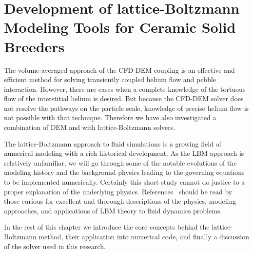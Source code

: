 \chapter{Development of lattice-Boltzmann Modeling Tools for Ceramic Solid Breeders}\label{sec:modeling-lbm}
The volume-averaged approach of the CFD-DEM coupling is an effective and efficient method for solving transiently coupled helium flow and pebble interaction. However, there are cases when a complete knowledge of the tortuous flow of the interstitial helium is desired. But because the CFD-DEM solver does not resolve the pathways on the particle scale, knowledge of precise helium flow is not possible with that technique. Therefore we have also investigated a combination of DEM and with lattice-Boltzmann solvers. 

The lattice-Boltzmann approach to fluid simulations is a growing field of numerical modeling with a rich historical development. As the LBM approach is relatively unfamiliar, we will go through some of the notable evolutions of the modeling history and the background physics leading to the governing equations to be implemented numerically. Certainly this short study cannot do justice to a proper explanation of the underlying physics. References~\cite{Chen1998a,Viggen2009,Sukop2007,Chopard2002,succi2001lattice} should be read by those curious for excellent and thorough descriptions of the physics, modeling approaches, and applications of LBM theory to fluid dynamics problems.

In the rest of this chapter we introduce the core concepts behind the lattice-Boltzmann method, their application into numerical code, and finally a discussion of the solver used in this research.




